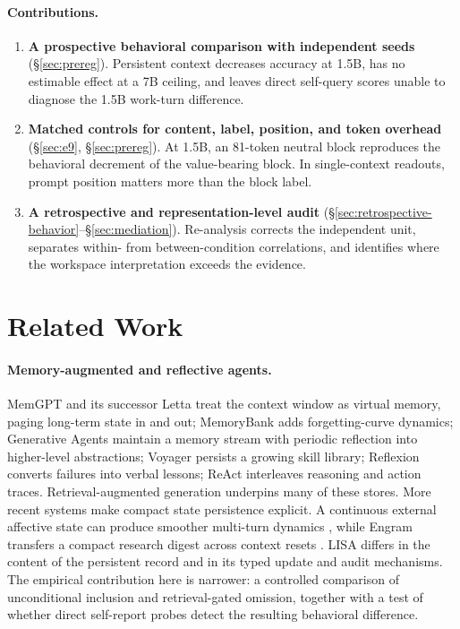 \documentclass[11pt]{article}
\begin{document}
\paragraph{Contributions.}
\begin{enumerate}
\item \textbf{A prospective behavioral comparison with independent seeds} (\S\ref{sec:prereg}). Persistent context decreases accuracy at 1.5B, has no estimable effect at a 7B ceiling, and leaves direct self-query scores unable to diagnose the 1.5B work-turn difference.
\item \textbf{Matched controls for content, label, position, and token overhead} (\S\ref{sec:e9}, \S\ref{sec:prereg}). At 1.5B, an 81-token neutral block reproduces the behavioral decrement of the value-bearing block. In single-context readouts, prompt position matters more than the block label.
\item \textbf{A retrospective and representation-level audit} (\S\ref{sec:retrospective-behavior}--\S\ref{sec:mediation}). Re-analysis corrects the independent unit, separates within- from between-condition correlations, and identifies where the workspace interpretation exceeds the evidence.
\end{enumerate}

\section{Related Work}
\paragraph{Memory-augmented and reflective agents.} MemGPT \citep{packer2023} and its successor Letta treat the context window as virtual memory, paging long-term state in and out; MemoryBank \citep{zhong2024memorybank} adds forgetting-curve dynamics; Generative Agents \citep{park2023} maintain a memory stream with periodic reflection into higher-level abstractions; Voyager \citep{wang2023voyager} persists a growing skill library; Reflexion \citep{shinn2023} converts failures into verbal lessons; ReAct \citep{yao2023react} interleaves reasoning and action traces. Retrieval-augmented generation \citep{lewis2020rag} underpins many of these stores. More recent systems make compact state persistence explicit. A continuous external affective state can produce smoother multi-turn dynamics \citep{subaharan2026state}, while Engram transfers a compact research digest across context resets \citep{karimi2026engram}. LISA differs in the content of the persistent record and in its typed update and audit mechanisms. The empirical contribution here is narrower: a controlled comparison of unconditional inclusion and retrieval-gated omission, together with a test of whether direct self-report probes detect the resulting behavioral difference.
\end{document}
